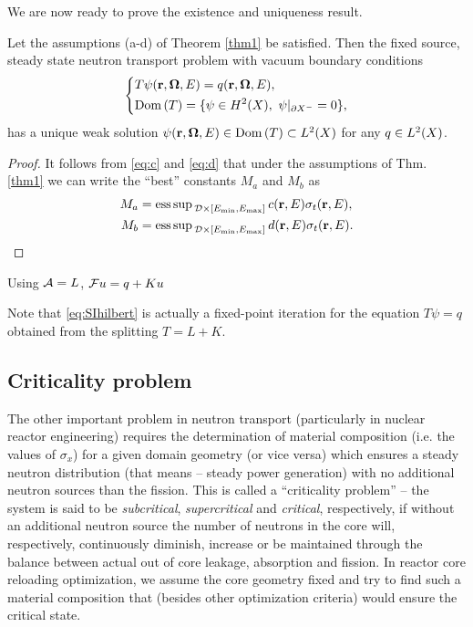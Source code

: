 {We are now ready to prove the existence and uniqueness result.
\begin{theorem}
	Let the assumptions (a-d) of Theorem \ref{thm1} be satisfied.
	Then the fixed source, steady state neutron transport problem with vacuum boundary conditions 
\begin{equation*}
  \left\{
  \begin{aligned}
     &T\psi(\br,\bomega,E) = q(\br,\bomega,E),\\
     &\Dom{T} = \{\psi\in \Hp[2](X),\ \psi\vert_{\pX[-]} = 0\},
  \end{aligned}
  \right.
\end{equation*}
has a unique weak solution $\psi(\br,\bomega,E)\in\Dom{T}\subset\Lp[2](X)$ for any $q\in \Lp[2](X)$.
\end{theorem}
\begin{proof}
	It follows from \eqref{eq:c} and \eqref{eq:d} that under the assumptions of Thm. \ref{thm1} we can write the ``best''
	constants $M_a$ and $M_b$ as 
	$$
	\begin{aligned}
		M_a &= \esssup_{\VV\times[\Emin,\Emax]} c(\br,E)\sigma_t(\br,E), \\
		M_b &= \esssup_{\VV\times[\Emin,\Emax]}	d(\br,E)\sigma_t(\br,E). 
	\end{aligned}
	$$
\end{proof}

Using $\genop{A} = L$,
$\genop{F}u = q + Ku$

Note that \eqref{eq:SIhilbert} is actually a fixed-point iteration for the equation $T\psi = q$ obtained from the
splitting $T = L + K$.
}
\subsection{Criticality problem}\label{sec:criticality}

The other important problem in neutron transport (particularly in nuclear reactor engineering) requires the
determination of material composition (i.e. the values of $\sigma_x$) for a given domain geometry (or vice versa)
which ensures a steady neutron distribution (that means -- steady power generation) with no additional neutron sources
than the fission. This is called a ``criticality problem'' -- the system is said to be \textit{subcritical},
\textit{supercritical} and \textit{critical}, respectively, if without an additional neutron source the number of
neutrons in the core will, respectively, continuously diminish, increase or be maintained through the
balance between actual out of core leakage, absorption and fission. In reactor core reloading optimization, we assume
the core geometry fixed and try to find such a material composition that (besides other optimization criteria) would
ensure the critical state. 


